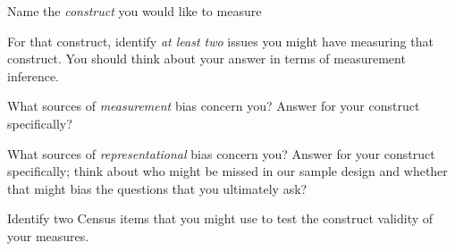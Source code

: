 \documentclass[11pt]{homework}
\begin{document}
\begin{questions}
\question[1] Name the \emph{construct} you would like to measure

\question[3] For that construct, identify \emph{at least two} issues you might have measuring that construct. You should think about your answer in terms of measurement inference. 

\question[2] What sources of \emph{measurement} bias concern you? Answer for your construct specifically?

\question[2] What sources of \emph{representational} bias concern you? Answer for your construct specifically; think about who might be missed in our sample design and whether that might bias the questions that you ultimately ask? 

\question[1] Identify two Census items that you might use to test the construct validity of your measures. 

\end{questions}
\end{document}
